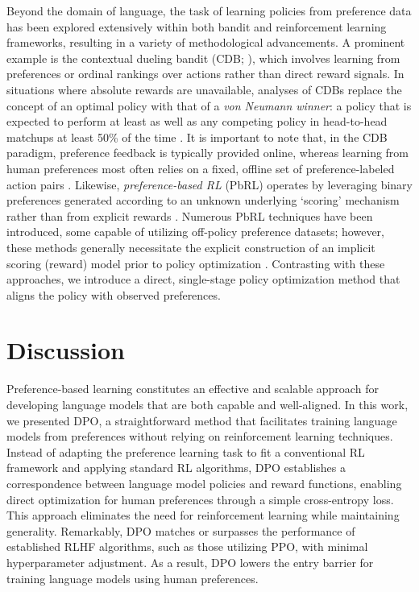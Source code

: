 Beyond the domain of language, the task of learning policies from preference data has been explored extensively within both bandit and reinforcement learning frameworks, resulting in a variety of methodological advancements. A prominent example is the contextual dueling bandit (CDB; \cite{yue2012karmed,dudik2015contextual}), which involves learning from preferences or ordinal rankings over actions rather than direct reward signals. In situations where absolute rewards are unavailable, analyses of CDBs replace the concept of an optimal policy with that of a \textit{von Neumann winner}: a policy that is expected to perform at least as well as any competing policy in head-to-head matchups at least 50\% of the time \citep{dudik2015contextual}. It is important to note that, in the CDB paradigm, preference feedback is typically provided online, whereas learning from human preferences most often relies on a fixed, offline set of preference-labeled action pairs \citep{yan2022human}. Likewise, \textit{preference-based RL} (PbRL) operates by leveraging binary preferences generated according to an unknown underlying ‘scoring’ mechanism rather than from explicit rewards \citep{BusaFekete2014,ruiz2023dueling}. Numerous PbRL techniques have been introduced, some capable of utilizing off-policy preference datasets; however, these methods generally necessitate the explicit construction of an implicit scoring (reward) model prior to policy optimization \citep{jain2013learning,BusaFekete2014,christiano2017deep,sadigh2017active,kupcsik2018learning}. Contrasting with these approaches, we introduce a direct, single-stage policy optimization method that aligns the policy with observed preferences.

\section{Discussion}
Preference-based learning constitutes an effective and scalable approach for developing language models that are both capable and well-aligned. In this work, we presented DPO, a straightforward method that facilitates training language models from preferences without relying on reinforcement learning techniques. Instead of adapting the preference learning task to fit a conventional RL framework and applying standard RL algorithms, DPO establishes a correspondence between language model policies and reward functions, enabling direct optimization for human preferences through a simple cross-entropy loss. This approach eliminates the need for reinforcement learning while maintaining generality. Remarkably, DPO matches or surpasses the performance of established RLHF algorithms, such as those utilizing PPO, with minimal hyperparameter adjustment. As a result, DPO lowers the entry barrier for training language models using human preferences.

